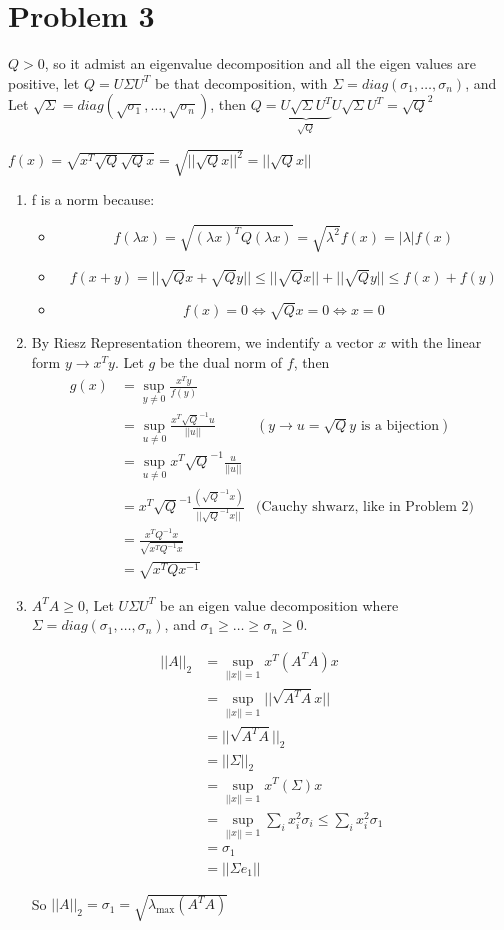 \documentclass[12pt]{article}
\newenvironment{problem}[1]
{\section*{Problem #1}}{}
\begin{document}
\begin{problem}{3}

  $Q > 0$, so it admist an eigenvalue decomposition and all the eigen values are positive, let $Q = U\Sigma U^T$ be that decomposition, with $\Sigma = diag(\sigma_1, \ldots, \sigma_n)$, and Let $\sqrt{\Sigma} =diag(\sqrt{\sigma_1}, \ldots, \sqrt{\sigma_n})$, then $Q = \underbrace{U\sqrt{\Sigma}U^T}_{\sqrt Q}U\sqrt{\Sigma}U^T = \sqrt{Q}^2$

  $f(x) = \sqrt{ x^T\sqrt{Q}\sqrt{Q}x} = \sqrt{ ||\sqrt Q x||^2} = ||\sqrt Q x||$

  \begin{enumerate}
  \item f is a norm because:

    \begin{itemize}
    \item $$f(\lambda x) = \sqrt{(\lambda x)^TQ(\lambda x)} = \sqrt{\lambda^2} f(x) = |\lambda| f(x)$$
    \item
      $$f(x + y) = ||\sqrt{Q}x + \sqrt{Q}y|| \le ||\sqrt{Q}x|| + ||\sqrt{Q}y|| \le f(x)+ f(y)$$
    \item $$f(x) = 0 \iff \sqrt{Q}x = 0 \iff x = 0$$
    \end{itemize}
  \item

    By Riesz Representation theorem, we indentify a vector $x$ with the linear form $y \rightarrow x^Ty$.
    Let $g$ be the dual norm of $f$, then
    \begin{align*}
      g(x) &= \sup_{y \ne 0} \frac{x^Ty}{f(y)}
      \\&= \sup_{u \ne 0} \frac{x^T\sqrt{Q}^{-1}u}{||u||} &(y \rightarrow u=\sqrt{Q}y \text{ is a bijection})
      \\&= \sup_{u \ne 0} x^T\sqrt{Q}^{-1}\frac{u}{||u||}
      \\&= x^T\sqrt{Q}^{-1}\frac{(\sqrt{Q}^{-1}x)}{||\sqrt{Q}^{-1}x||} &\text{(Cauchy shwarz, like in Problem 2)}
      \\&= \frac{x^TQ^{-1}x}{\sqrt{x^TQ^{-1}x}}
      \\ &= \sqrt{x^TQx^{-1}}
    \end{align*}

  \item
    $A^TA \ge 0$, Let $U\Sigma U^T$ be an eigen value decomposition where $\Sigma = diag(\sigma_1, \ldots, \sigma_n)$, and $\sigma_1 \ge \ldots \ge \sigma_n \ge 0$.
    
    \begin{align*}
      ||A||_2 &= \sup_{||x||=1} x^T(A^TA)x
      \\&= \sup_{||x||=1} ||\sqrt{A^TA}x||
      \\&= ||\sqrt{A^TA}||_2
      \\&= ||\Sigma||_2 \\&= \sup_{||x||=1} x^T(\Sigma)x \\&= \sup_{||x||=1} \sum_i x_i^2 \sigma_i \le \sum_{i} x_i^2 \sigma_1 \\&= \sigma_1 \\&= ||\Sigma e_1||
    \end{align*}

    So $||A||_2 = \sigma_1 = \sqrt{\lambda_{\text{max}}(A^TA)}$

  \end{enumerate}
\end{problem}
\end{document}
